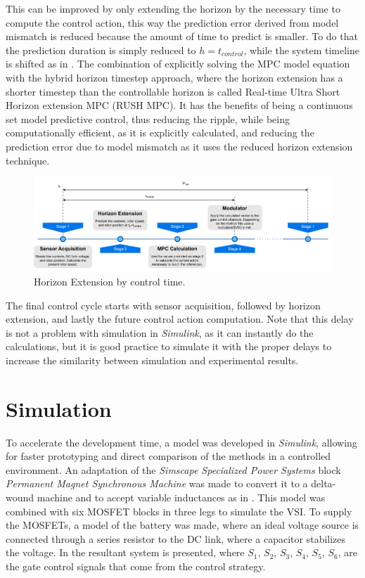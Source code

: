 \documentclass[9pt,conference]{IEEEtran}
\begin{document}
This can be improved by only extending the horizon by the necessary time to compute the control action, this way the prediction error derived from model mismatch is reduced because the amount of time to predict is smaller. To do that the prediction duration is simply reduced to $h = t_{control}$, while the system timeline is shifted as in . The combination of explicitly solving the MPC model equation with the hybrid horizon timestep approach, where the horizon extension has a shorter timestep than the controllable horizon is called Real-time Ultra Short Horizon extension MPC (RUSH MPC). It has the benefits of being a continuous set model predictive control, thus reducing the ripple, while being computationally efficient, as it is explicitly calculated, and reducing the prediction error due to model mismatch as it uses the reduced horizon extension technique.

\begin{figure}[!htb]
	\centering
	\includegraphics[width=.8\linewidth]{Figures/Horizon Extension Timeline.pdf}
	\caption[Horizon Extension by control time.]{Horizon Extension by control time.}
	\label{fig:horizon_extend_timeline} %
\end{figure}

The final control cycle starts with sensor acquisition, followed by horizon extension, and lastly the future control action computation. Note that this delay is not a problem with simulation in \textit{Simulink}, as it can instantly do the calculations, but it is good practice to simulate it with the proper delays to increase the similarity between simulation and experimental results.

\section{Simulation}
\label{section:simulation}%

To accelerate the development time, a model was developed in \textit{Simulink}, allowing for faster prototyping and direct comparison of the methods in a controlled environment. An adaptation of the \textit{Simscape Specialized Power Systems} block \textit{Permanent Magnet Synchronous Machine} was made to convert it to a delta-wound machine and to accept variable inductances as in . 
This model was combined with six MOSFET blocks in three legs to simulate the VSI. To supply the MOSFETs, a model of the battery was made, where an ideal voltage source is connected through a series resistor to the DC link, where a capacitor stabilizes the voltage. In  the resultant system is presented, where $S_1$, $S_2$, $S_3$, $S_4$, $S_5$, $S_6$, are the gate control signals that come from the control strategy.
\end{document}
